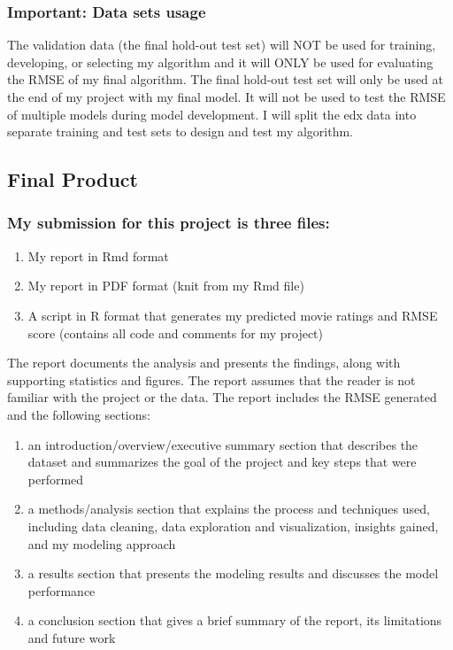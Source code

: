 \documentclass[
]{article}
\providecommand{\tightlist}{%
  \setlength{\itemsep}{0pt}\setlength{\parskip}{0pt}}
\begin{document}
\hypertarget{important-data-sets-usage}{%
\subsubsection{Important: Data sets
usage}\label{important-data-sets-usage}}

The validation data (the final hold-out test set) will NOT be used for
training, developing, or selecting my algorithm and it will ONLY be used
for evaluating the RMSE of my final algorithm. The final hold-out test
set will only be used at the end of my project with my final model. It
will not be used to test the RMSE of multiple models during model
development. I will split the edx data into separate training and test
sets to design and test my algorithm.

\hypertarget{final-product}{%
\subsection{Final Product}\label{final-product}}

\hypertarget{my-submission-for-this-project-is-three-files}{%
\subsubsection{My submission for this project is three
files:}\label{my-submission-for-this-project-is-three-files}}

\begin{enumerate}
\def\labelenumi{\arabic{enumi}.}
\tightlist
\item
  My report in Rmd format
\item
  My report in PDF format (knit from my Rmd file)
\item
  A script in R format that generates my predicted movie ratings and
  RMSE score (contains all code and comments for my project)
\end{enumerate}

The report documents the analysis and presents the findings, along with
supporting statistics and figures. The report assumes that the reader is
not familiar with the project or the data. The report includes the RMSE
generated and the following sections:

\begin{enumerate}
\def\labelenumi{\arabic{enumi}.}
\item
  an introduction/overview/executive summary section that describes the
  dataset and summarizes the goal of the project and key steps that were
  performed
\item
  a methods/analysis section that explains the process and techniques
  used, including data cleaning, data exploration and visualization,
  insights gained, and my modeling approach
\item
  a results section that presents the modeling results and discusses the
  model performance
\item
  a conclusion section that gives a brief summary of the report, its
  limitations and future work
\end{enumerate}
\end{document}
